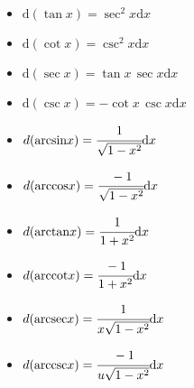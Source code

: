 \def\du\dx{{  }}
\def\d{{ \text{d} }}
\def\dx{{ \d x}}
\def\du{{ \d u }}
\def\dv{{ \d v }}

\def\sech{{ \mathop{\text{sech}} }}
\def\csch{{ \mathop{\text{csch}} }}

\def\arcsin{{ \mathop{\text{arcsin}} }}
\def\arccos{{ \mathop{\text{arccos}} }}
\def\arctan{{ \mathop{\text{arctan}} }}
\def\arccot{{ \mathop{\text{arccot}} }}
\def\arcsec{{ \mathop{\text{arcsec}} }}
\def\arccsc{{ \mathop{\text{arccsc}} }}

\def\arcsinh{{ \mathop{\text{arcsinh}} }}
\def\arccosh{{ \mathop{\text{arccosh}} }}
\def\arctanh{{ \mathop{\text{arctanh}} }}
\def\arccoth{{ \mathop{\text{arccoth}} }}
\def\arcsech{{ \mathop{\text{arcsech}} }}
\def\arccsch{{ \mathop{\text{arccsch}} }}

\begin{itemize}
\item $ \d(\tan x) = \sec^2 x \dx $
\item $ \d(\cot x) = \csc^2 x \dx $
\item $ \d(\sec x) = \tan x \, \sec x \dx $
\item $ \d(\csc x) = -\cot x \, \csc x \dx $
\item $ d(\arcsin x) = \cfrac{1}{\sqrt{1 - x^2}} \dx $
\item $ d(\arccos x) = \cfrac{-1}{\sqrt{1 - x^2}} \dx $
\item $ d(\arctan x) = \cfrac{1}{1 + x^2} \dx $
\item $ d(\arccot x) = \cfrac{-1}{1 + x^2} \dx $
\item $ d(\arcsec x) = \cfrac{1}{x \sqrt{1 - x^2}}\dx $
\item $ d(\arccsc x) = \cfrac{-1}{u \sqrt{1 - x^2}}\dx $
\end{itemize}

